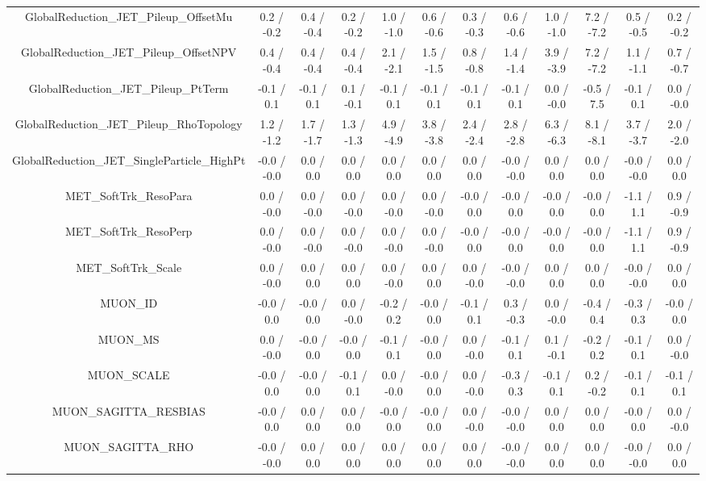 \begin{table}[htbp]
\begin{center}
\begin{tabular}{|c|c|c|c|c|c|c|c|c|c|c|c|}
  GlobalReduction_JET_Pileup_OffsetMu & 0.2 / -0.2 & 0.4 / -0.4 & 0.2 / -0.2 & 1.0 / -1.0 & 0.6 / -0.6 & 0.3 / -0.3 & 0.6 / -0.6 & 1.0 / -1.0 & 7.2 / -7.2 & 0.5 / -0.5 & 0.2 / -0.2 \\ 
  GlobalReduction_JET_Pileup_OffsetNPV & 0.4 / -0.4 & 0.4 / -0.4 & 0.4 / -0.4 & 2.1 / -2.1 & 1.5 / -1.5 & 0.8 / -0.8 & 1.4 / -1.4 & 3.9 / -3.9 & 7.2 / -7.2 & 1.1 / -1.1 & 0.7 / -0.7 \\ 
  GlobalReduction_JET_Pileup_PtTerm & -0.1 / 0.1 & -0.1 / 0.1 & 0.1 / -0.1 & -0.1 / 0.1 & -0.1 / 0.1 & -0.1 / 0.1 & -0.1 / 0.1 & 0.0 / -0.0 & -0.5 / 7.5 & -0.1 / 0.1 & 0.0 / -0.0 \\ 
  GlobalReduction_JET_Pileup_RhoTopology & 1.2 / -1.2 & 1.7 / -1.7 & 1.3 / -1.3 & 4.9 / -4.9 & 3.8 / -3.8 & 2.4 / -2.4 & 2.8 / -2.8 & 6.3 / -6.3 & 8.1 / -8.1 & 3.7 / -3.7 & 2.0 / -2.0 \\ 
  GlobalReduction_JET_SingleParticle_HighPt & -0.0 / -0.0 & 0.0 / 0.0 & 0.0 / 0.0 & 0.0 / 0.0 & 0.0 / 0.0 & 0.0 / 0.0 & -0.0 / -0.0 & 0.0 / 0.0 & 0.0 / 0.0 & -0.0 / -0.0 & 0.0 / 0.0 \\ 
  MET_SoftTrk_ResoPara & 0.0 / -0.0 & 0.0 / -0.0 & 0.0 / -0.0 & 0.0 / -0.0 & 0.0 / -0.0 & -0.0 / 0.0 & -0.0 / 0.0 & -0.0 / 0.0 & -0.0 / 0.0 & -1.1 / 1.1 & 0.9 / -0.9 \\ 
  MET_SoftTrk_ResoPerp & 0.0 / -0.0 & 0.0 / -0.0 & 0.0 / -0.0 & 0.0 / -0.0 & 0.0 / -0.0 & -0.0 / 0.0 & -0.0 / 0.0 & -0.0 / 0.0 & -0.0 / 0.0 & -1.1 / 1.1 & 0.9 / -0.9 \\ 
  MET_SoftTrk_Scale & 0.0 / -0.0 & 0.0 / 0.0 & 0.0 / 0.0 & 0.0 / -0.0 & 0.0 / 0.0 & 0.0 / -0.0 & -0.0 / -0.0 & 0.0 / 0.0 & 0.0 / 0.0 & -0.0 / -0.0 & 0.0 / 0.0 \\ 
  MUON_ID & -0.0 / 0.0 & -0.0 / 0.0 & 0.0 / -0.0 & -0.2 / 0.2 & -0.0 / 0.0 & -0.1 / 0.1 & 0.3 / -0.3 & 0.0 / -0.0 & -0.4 / 0.4 & -0.3 / 0.3 & -0.0 / 0.0 \\ 
  MUON_MS & 0.0 / -0.0 & -0.0 / 0.0 & -0.0 / 0.0 & -0.1 / 0.1 & -0.0 / 0.0 & 0.0 / -0.0 & -0.1 / 0.1 & 0.1 / -0.1 & -0.2 / 0.2 & -0.1 / 0.1 & 0.0 / -0.0 \\ 
  MUON_SCALE & -0.0 / 0.0 & -0.0 / 0.0 & -0.1 / 0.1 & 0.0 / -0.0 & -0.0 / 0.0 & 0.0 / -0.0 & -0.3 / 0.3 & -0.1 / 0.1 & 0.2 / -0.2 & -0.1 / 0.1 & -0.1 / 0.1 \\ 
  MUON_SAGITTA_RESBIAS & -0.0 / 0.0 & 0.0 / 0.0 & 0.0 / 0.0 & -0.0 / 0.0 & -0.0 / 0.0 & 0.0 / -0.0 & -0.0 / -0.0 & 0.0 / 0.0 & 0.0 / 0.0 & -0.0 / 0.0 & 0.0 / -0.0 \\ 
  MUON_SAGITTA_RHO & -0.0 / -0.0 & 0.0 / 0.0 & 0.0 / 0.0 & 0.0 / 0.0 & 0.0 / 0.0 & 0.0 / 0.0 & -0.0 / -0.0 & 0.0 / 0.0 & 0.0 / 0.0 & -0.0 / -0.0 & 0.0 / 0.0 \\ 

\end{tabular}
\end{center}
\end{table}
